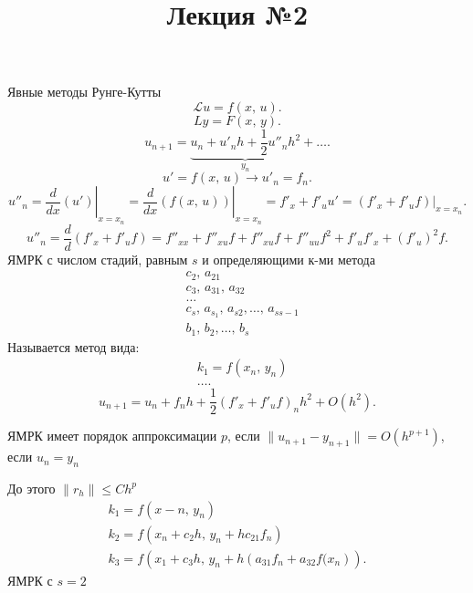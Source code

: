 \documentclass[a4paper]{article}
\title{Лекция №2}
\begin{document}
	\maketitle
Явные методы Рунге-Кутты
\[
	\mathcal{L} u =f(x,\,u)
.\] 
\[
	Ly=F(x,\,y)
.\] 
\[
u_{n+1}= \underbrace{u_n+ u'_n h+ \frac{1}{2}u''_n h^2}_{y_n}+\ldots
.\] 
\[
	u'=f(x,\,u)\to  u'_n=f_n
.\] 
\[
	u''_n= \left. \frac{d}{dx}(u') \right|_{x=x_n}=
		\left. \frac{d}{dx}\left( f(x,\,u) \right)  \right|_{
			x=x_n}= f'_x+f'_u u'= \left. \left( 
		f'_x+f'_u f\right)  \right|_{x=x_n}
.\] 
\[
	u''_n= \frac{d}{d}(f'_x+f'_u f)= f''_{x x}+
	f''_{xu}f+f''_{xu}f+f''_{uu}f^2+f'_uf'_x+(f'_u)^2f
.\] 
ЯМРК с числом стадий, равным $s$ и определяющими к-ми
	метода
	\begin{align*}
		&c_2,\,a_{21}\\
		&c_3,\, a_{31},\,a_{32}\\
		&\ldots\\
		&c_s,\,a_{s_1},\,a_{s2},\ldots,\,a_{s s-1}\\
		&b_1,\,b_2,\ldots,\,b_s
	\end{align*} 
	Называется метод вида:
	\begin{align*}
		&k_1=f(x_n,\,y_n)\\
		&\ldots
	.\end{align*} 
\[
	u_{n+1}= u_n+f_n h + \frac{1}{2}\left( f'_x+f'_uf \right) _n h^2+ O(h^2)
.\] 
\begin{dfn}
ЯМРК имеет порядок аппроксимации $p$, если $\| u_{n+1}-y_{n+1}\|=
 O\left( h^{p+1} \right) $, если $u_n=y_n$
\end{dfn}
До этого $\| r_h\|\le Ch^p$
\begin{align*}
	k_1=f(x-n,\,y_n)\\
	k_2=f(x_n+c_2 h ,\,y_n+h c_{21} f_n)\\
	k_3= f\left( x_1+c_3 h,\,y_n+h\left( a_{31}f_n+a_{32}f(x_n \right)  \right) 
.\end{align*}
ЯМРК с $s=2$
\end{document}
